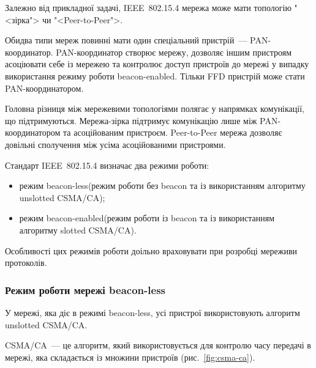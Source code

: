 \documentclass[a4paper,ukrainian,utf8,nocolumnsxix,floatsection,equationsection]{eskdtext}
\renewcommand\paragraph{\subsubsection}
\newcommand{\figref}[1]{рис.~\ref{#1}}
\newcommand{\iee}[0]{IEEE~802.15.4\xspace}
\newcommand{\csma}[0]{CSMA/CA\xspace}
\newcommand{\ucsma}[0]{unslotted \csma\xspace}
\newcommand{\scsma}[0]{slotted \csma\xspace}
\newcommand{\blm}[0]{beacon-less\xspace}
\newcommand{\bem}[0]{beacon-enabled\xspace}
\begin{document}
Залежно від прикладної задачі, \iee мережа може мати топологію "<зірка"> чи "<Peer-to-Peer">. 

Обидва типи мереж повинні мати один спеціальний пристрій~--- PAN-координатор. PAN-координатор створює мережу, дозволяє іншим пристроям асоціювати себе із мережею та контролює доступ пристроїв до мережі у випадку використання режиму роботи \bem. Тільки FFD пристрій може стати PAN-координатором.

Головна різниця між мережевими топологіями полягає у напрямках комунікації, що підтримуються. Мережа-зірка підтримує комунікацію лише між PAN-координатором та асоційованим пристроєм. Peer-to-Peer мережа дозволяє довільні сполучення між усіма асоційованими пристроями.

Стандарт \iee визначає два режими роботи:
\begin{itemize}
	\item режим \blm (режим роботи без beacon та із використанням алгоритму \ucsma);
	\item режим \bem (режим роботи із beacon та із використанням алгоритму \scsma).
\end{itemize}

Особливості цих режимів роботи доільно враховувати при розробці мереживи протоколів.

\paragraph{Режим роботи мережі \blm}

У мережі, яка діє в режимі \blm, усі пристрої використовують алгоритм \ucsma.

\csma~--- це алгоритм, який використовується для контролю часу передачі в мережі, яка складається із множини пристроїв (\figref{fig:csma-ca}).
\end{document}
